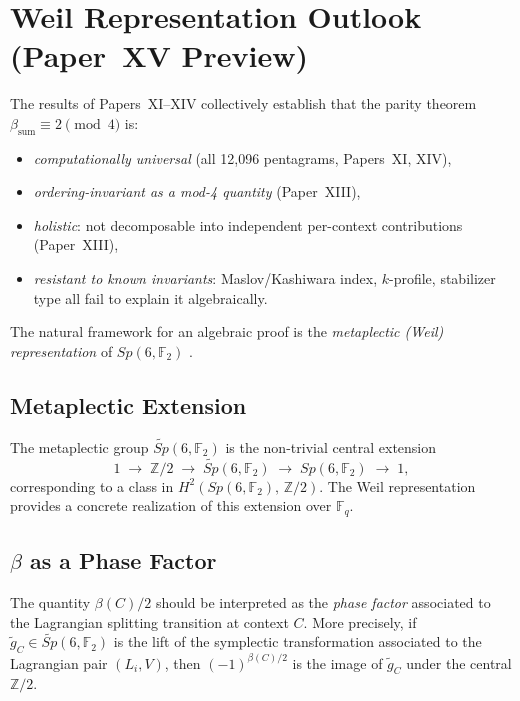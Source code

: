 \documentclass[11pt,a4paper]{article}
\theoremstyle{remark}
\begin{document}
\section{Weil Representation Outlook (Paper~XV Preview)}\label{sec:weil}

The results of Papers~XI--XIV collectively establish that the parity theorem
$\beta_{\mathrm{sum}} \equiv 2 \pmod 4$ is:
\begin{itemize}
  \item \emph{computationally universal} (all 12{,}096 pentagrams, Papers~XI, XIV),
  \item \emph{ordering-invariant as a mod-4 quantity} (Paper~XIII),
  \item \emph{holistic}: not decomposable into independent per-context contributions
        (Paper~XIII),
  \item \emph{resistant to known invariants}: Maslov/Kashiwara index,
        $k$-profile, stabilizer type all fail to explain it algebraically.
\end{itemize}

The natural framework for an algebraic proof is the \emph{metaplectic
(Weil) representation} of $Sp(6,\mathbb{F}_2)$ \cite{LionVergne1980,Gerardin}.

\subsection{Metaplectic Extension}

The metaplectic group $\widetilde{Sp}(6,\mathbb{F}_2)$ is the non-trivial
central extension
\[
  1 \;\longrightarrow\; \mathbb{Z}/2 \;\longrightarrow\;
  \widetilde{Sp}(6,\mathbb{F}_2) \;\longrightarrow\;
  Sp(6,\mathbb{F}_2) \;\longrightarrow\; 1,
\]
corresponding to a class in $H^2(Sp(6,\mathbb{F}_2),\,\mathbb{Z}/2)$.
The Weil representation \cite{Gerardin} provides a concrete realization of this
extension over $\mathbb{F}_q$.

\subsection{\texorpdfstring{$\beta$ as a Phase Factor}{beta as a Phase Factor}}

The quantity $\beta(C)/2$ should be interpreted as the \emph{phase factor}
associated to the Lagrangian splitting transition at context $C$.
More precisely, if $\tilde{g}_C \in \widetilde{Sp}(6,\mathbb{F}_2)$ is the
lift of the symplectic transformation associated to the Lagrangian pair
$(L_i, V)$, then $(-1)^{\beta(C)/2}$ is the image of $\tilde{g}_C$ under the
central $\mathbb{Z}/2$.
\end{document}

